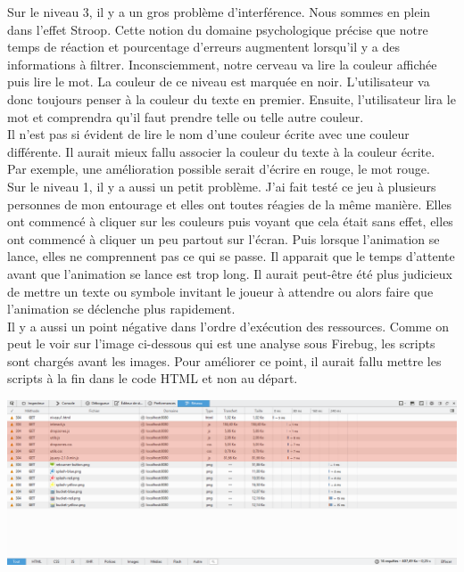 \documentclass{article}
\begin{document}
Sur le niveau 3, il y a un gros problème d'interférence. Nous sommes en plein dans l'effet Stroop. Cette notion du domaine psychologique précise que notre temps de réaction et pourcentage d'erreurs augmentent lorsqu'il y a des informations à filtrer. Inconsciemment, notre cerveau va lire la couleur affichée puis lire le mot. La couleur de ce niveau est marquée en noir. L'utilisateur va donc toujours penser à la couleur du texte en premier. Ensuite, l'utilisateur lira le mot et comprendra qu'il faut prendre telle ou telle autre couleur.
\vspace{0.5cm}\\

Il n'est pas si évident de lire le nom d'une couleur écrite avec une couleur différente. Il aurait mieux fallu associer la couleur du texte à la couleur écrite. Par exemple, une amélioration possible serait d'écrire en rouge, le mot rouge.\\

Sur le niveau 1, il y a aussi un petit problème. J'ai fait testé ce jeu à plusieurs personnes de mon entourage et elles ont toutes réagies de la même manière. Elles ont commencé à cliquer sur les couleurs puis voyant que cela était sans effet, elles ont commencé à cliquer un peu partout sur l'écran. Puis lorsque l'animation se lance, elles ne comprennent pas ce qui se passe. Il apparait que le temps d'attente avant que l'animation se lance est trop long. Il aurait peut-être été plus judicieux de mettre un texte ou symbole invitant le joueur à attendre ou alors faire que l'animation se déclenche plus rapidement.\\

Il y a aussi un point négative dans l'ordre d'exécution des ressources. Comme on peut le voir sur l'image ci-dessous qui est une analyse sous Firebug, les scripts sont chargés avant les images. Pour améliorer ce point, il aurait fallu mettre les scripts à la fin dans le code HTML et non au départ. 

\begin{center}
\vspace{0.5cm}
\includegraphics[width=\textwidth]{7}\\
\end{center}
\end{document}
